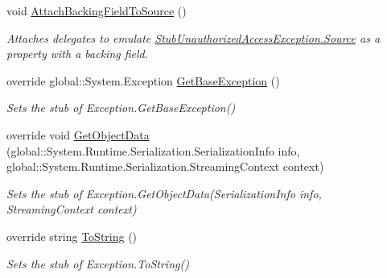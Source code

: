 \begin{DoxyCompactItemize}
void \hyperlink{class_system_1_1_fakes_1_1_stub_unauthorized_access_exception_adbe028256563bd2078272438525cb50a}{Attach\-Backing\-Field\-To\-Source} ()
\begin{DoxyCompactList}\small\item\em Attaches delegates to emulate \hyperlink{class_system_1_1_fakes_1_1_stub_unauthorized_access_exception_a95c363c2f38fceee6220244974b0b439}{Stub\-Unauthorized\-Access\-Exception.\-Source} as a property with a backing field.\end{DoxyCompactList}\item 
override global\-::\-System.\-Exception \hyperlink{class_system_1_1_fakes_1_1_stub_unauthorized_access_exception_a46d13820e7a0f95d04ca52aa581daa22}{Get\-Base\-Exception} ()
\begin{DoxyCompactList}\small\item\em Sets the stub of Exception.\-Get\-Base\-Exception()\end{DoxyCompactList}\item 
override void \hyperlink{class_system_1_1_fakes_1_1_stub_unauthorized_access_exception_a110eb70347af7a3b64716092131c18a0}{Get\-Object\-Data} (global\-::\-System.\-Runtime.\-Serialization.\-Serialization\-Info info, global\-::\-System.\-Runtime.\-Serialization.\-Streaming\-Context context)
\begin{DoxyCompactList}\small\item\em Sets the stub of Exception.\-Get\-Object\-Data(\-Serialization\-Info info, Streaming\-Context context)\end{DoxyCompactList}\item 
override string \hyperlink{class_system_1_1_fakes_1_1_stub_unauthorized_access_exception_a27fe6b724d97ee27fbfe9f13ff0ca1ac}{To\-String} ()
\begin{DoxyCompactList}\small\item\em Sets the stub of Exception.\-To\-String()\end{DoxyCompactList}\end{DoxyCompactItemize}
